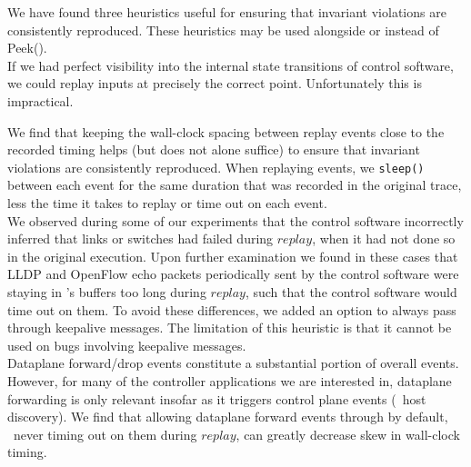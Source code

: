 We have found three heuristics useful for ensuring that invariant violations are consistently reproduced.
These heuristics may be used alongside or instead of {\sc Peek()}.\\[0.5ex]
%
 If we had perfect visibility into
the internal state transitions of control software, we could replay inputs at precisely the correct point.
Unfortunately this is impractical.

We find that keeping the wall-clock spacing between replay events
close to the recorded timing helps (but does not alone suffice) to
ensure that invariant violations are consistently
reproduced. When replaying events, we \verb=sleep()= between each
event for the same duration that was recorded in the original trace,
less the time it takes to replay or time out on each event.\\[0.5ex]
%
 We observed during some
of our experiments that the control software incorrectly inferred that links or switches had
failed during $replay$, when it had not done so in the original execution.
Upon further examination we found in these cases that LLDP and OpenFlow echo
packets periodically sent by the control software were
staying in \projectname's buffers too long during $replay$, such that the
control software would time out on them. To avoid these differences,
we added an option to always pass through
keepalive messages. The limitation of this
heuristic is that it cannot be used on bugs involving keepalive
messages.\\[0.5ex]
%
%
 Dataplane forward/drop events constitute a
substantial portion of overall events. However, for
many of the controller applications we are interested in, dataplane
forwarding is only relevant insofar as it triggers control plane events
(\eg~host discovery). We find that allowing dataplane forward events through by
default, \ie~never timing out on them during $replay$, can greatly decrease
skew in wall-clock timing.

